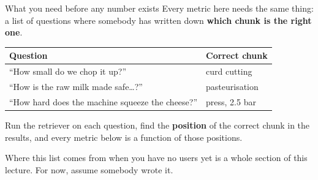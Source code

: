 \documentclass[aspectratio=169]{beamer}
\newcommand{\keybox}[1]{%
  \begin{tcolorbox}[colback=armblue!8, colframe=armblue, boxrule=0.6pt, arc=2pt]
  #1
  \end{tcolorbox}}
\begin{document}
\begin{frame}{What you need before any number exists}
  \vspace{0.3em}
  Every metric here needs the same thing: a list of questions where somebody has written
  down \textbf{which chunk is the right one}.

  \vspace{0.4em}
  \begin{center}
  \small
  \begin{tabular}{ll}
    \toprule
    \textbf{Question} & \textbf{Correct chunk} \\
    \midrule
    ``How small do we chop it up?''              & curd cutting \\
    ``How is the raw milk made safe\ldots?''      & pasteurisation \\
    ``How hard does the machine squeeze the cheese?'' & press, 2.5 bar \\
    \bottomrule
  \end{tabular}
  \end{center}

  \vspace{0.45em}
  Run the retriever on each question, find the \textbf{position} of the correct chunk in
  the results, and every metric below is a function of those positions.

  \vspace{0.35em}
  \keybox{Where this list comes from when you have no users yet is a whole section of this
  lecture. For now, assume somebody wrote it.}
\end{frame}
\end{document}
